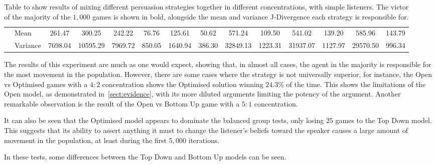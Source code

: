 \begin{table}[H]
\begin{adjustbox}{max width = \textwidth}
\begin{tabular}{ll||cc|cc|cc|cc|cc|cc}
 & Mean & 261.47 & 300.25 & 242.22 & 76.76 & 125.61 & 50.62 & 571.24 & 109.50 & 541.02 & 139.20 & 585.96 & 143.79 \\
 & Variance & 7698.04 & 10595.29 & 7969.72 & 850.05 & 1640.94 & 386.30 & 32849.13 & 1223.31 & 31937.07 & 1127.97 & 29570.50 & 996.34
\end{tabular}
\end{adjustbox}
\caption{Table to show results of mixing different persuasion strategies together in different concentrations, with simple listeners. The victor of the majority of the $1,000$ games is shown in bold, alongside the mean and variance J-Divergence each strategy is responsible for. }
\end{table}


The results of this experiment are much as one would expect, showing that, in almost all cases, the agent in the majority is responsible for the most movement in the population. However, there are some cases where the strategy is not universally superior, for instance, the Open vs Optimised games with a $4:2$ concentration shows the Optimised solution winning $24.3 \%$ of the time. This shows the limitations of the Open model, as demonstrated in~\cref{sect:evidence}, with its more diluted arguments limiting the potency of the argument. Another remarkable observation is the result of the Open vs Bottom Up game with a $5:1$ concentration. 

It can also be seen that the Optimised model appears to dominate the balanced group tests, only losing $25$ games to the Top Down model. This suggests that its ability to assert anything it must to change the listener's beliefs toward the speaker causes a large amount of movement in the population, at least during the first $5,000$ iterations. 

In these tests, some differences between the Top Down and Bottom Up models can be seen. 